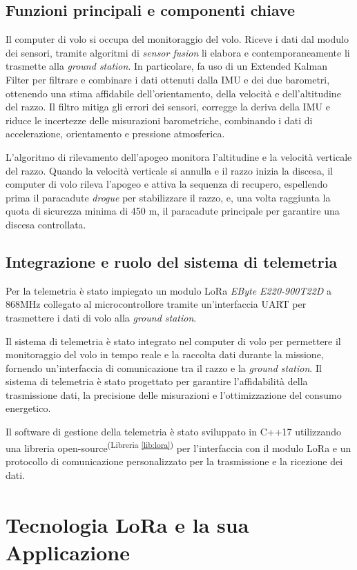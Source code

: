 \documentclass[12pt,a4paper,twoside]{book}
\newcommand{\libref}[1]{\textsuperscript{(Libreria \ref{#1})}}
\begin{document}
\section{Funzioni principali e componenti chiave}
Il computer di volo si occupa del monitoraggio del volo. Riceve i dati dal modulo
dei sensori, tramite algoritmi di \emph{sensor fusion} li elabora e
contemporaneamente li trasmette alla \emph{ground station}.
In particolare, fa uso di un Extended Kalman Filter per filtrare e combinare i
dati ottenuti dalla \ac{IMU} e dei due barometri, ottenendo una stima
affidabile dell'orientamento, della velocità e dell'altitudine del razzo.
Il filtro mitiga gli errori dei sensori, corregge la deriva della \ac{IMU} e riduce
le incertezze delle misurazioni barometriche, combinando i dati di accelerazione,
orientamento e pressione atmosferica.

L'algoritmo di rilevamento dell'apogeo monitora l'altitudine e la velocità verticale
del razzo.
Quando la velocità verticale si annulla e il razzo inizia la discesa, il
computer di volo rileva l'apogeo e attiva la sequenza di recupero,
espellendo prima il paracadute \emph{drogue} per stabilizzare il razzo, e, una volta 
raggiunta la quota di sicurezza minima di 450 m, il paracadute principale per 
garantire una discesa controllata.

\section{Integrazione e ruolo del sistema di telemetria}
Per la telemetria è stato impiegato un modulo \ac{LoRa} \emph{EByte E220-900T22D}
a 868MHz collegato al microcontrollore tramite un'interfaccia \ac{UART}
per trasmettere i dati di volo alla \emph{ground station}.

Il sistema di telemetria è stato integrato nel computer di volo per permettere il
monitoraggio del volo in tempo reale e la raccolta dati durante la missione,
fornendo un'interfaccia di comunicazione tra il razzo e la \emph{ground station}.
Il sistema di telemetria è stato progettato per garantire l'affidabilità della
trasmissione dati, la precisione delle misurazioni e l'ottimizzazione del consumo
energetico.%

Il software di gestione della telemetria è stato sviluppato in C++17 utilizzando
una libreria open-source\libref{lib:lora} per l'interfaccia con il modulo \ac{LoRa}
e un protocollo di comunicazione personalizzato per la trasmissione e la
ricezione dei dati.

\chapter{Tecnologia \texorpdfstring{LoRa\textsuperscript{\textcopyright}}{} e la sua Applicazione} \label{chap:lora}
\end{document}
